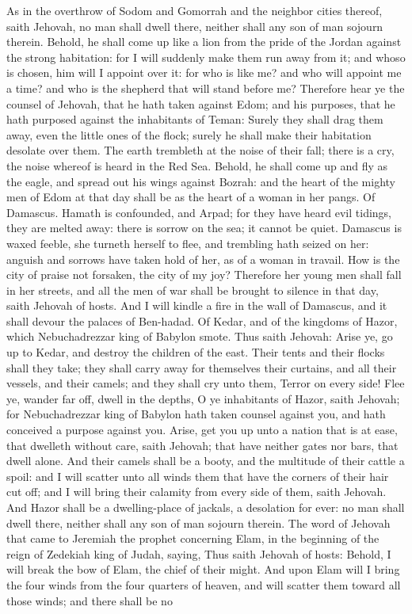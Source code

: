 As in the overthrow of Sodom and Gomorrah and the neighbor cities thereof, saith Jehovah, no man shall dwell there, neither shall any son of man sojourn therein. Behold, he shall come up like a lion from the pride of the Jordan against the strong habitation: for I will suddenly make them run away from it; and whoso is chosen, him will I appoint over it: for who is like me? and who will appoint me a time? and who is the shepherd that will stand before me?  Therefore hear ye the counsel of Jehovah, that he hath taken against Edom; and his purposes, that he hath purposed against the inhabitants of Teman: Surely they shall drag them away, even the little ones of the flock; surely he shall make their habitation desolate over them. The earth trembleth at the noise of their fall; there is a cry, the noise whereof is heard in the Red Sea. Behold, he shall come up and fly as the eagle, and spread out his wings against Bozrah: and the heart of the mighty men of Edom at that day shall be as the heart of a woman in her pangs.  Of Damascus. Hamath is confounded, and Arpad; for they have heard evil tidings, they are melted away: there is sorrow on the sea; it cannot be quiet. Damascus is waxed feeble, she turneth herself to flee, and trembling hath seized on her: anguish and sorrows have taken hold of her, as of a woman in travail. How is the city of praise not forsaken, the city of my joy? Therefore her young men shall fall in her streets, and all the men of war shall be brought to silence in that day, saith Jehovah of hosts. And I will kindle a fire in the wall of Damascus, and it shall devour the palaces of Ben-hadad.  Of Kedar, and of the kingdoms of Hazor, which Nebuchadrezzar king of Babylon smote. Thus saith Jehovah: Arise ye, go up to Kedar, and destroy the children of the east. Their tents and their flocks shall they take; they shall carry away for themselves their curtains, and all their vessels, and their camels; and they shall cry unto them, Terror on every side! Flee ye, wander far off, dwell in the depths, O ye inhabitants of Hazor, saith Jehovah; for Nebuchadrezzar king of Babylon hath taken counsel against you, and hath conceived a purpose against you. Arise, get you up unto a nation that is at ease, that dwelleth without care, saith Jehovah; that have neither gates nor bars, that dwell alone. And their camels shall be a booty, and the multitude of their cattle a spoil: and I will scatter unto all winds them that have the corners of their hair cut off; and I will bring their calamity from every side of them, saith Jehovah. And Hazor shall be a dwelling-place of jackals, a desolation for ever: no man shall dwell there, neither shall any son of man sojourn therein.  The word of Jehovah that came to Jeremiah the prophet concerning Elam, in the beginning of the reign of Zedekiah king of Judah, saying, Thus saith Jehovah of hosts: Behold, I will break the bow of Elam, the chief of their might. And upon Elam will I bring the four winds from the four quarters of heaven, and will scatter them toward all those winds; and there shall be no 